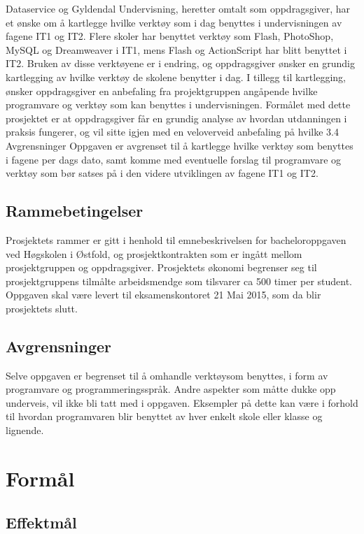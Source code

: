 \documentclass[norsk,a4paper,12pt]{article}
\begin{document}
Dataservice og Gyldendal Undervisning, heretter omtalt som oppdragsgiver,  har et ønske om å kartlegge hvilke verktøy som i dag benyttes i undervisningen av fagene IT1 og IT2. 
Flere skoler har benyttet verktøy som Flash, PhotoShop, MySQL og Dreamweaver i IT1, mens Flash og ActionScript har blitt benyttet i IT2. 
Bruken av disse verktøyene er i endring, og oppdragsgiver ønsker en grundig kartlegging av hvilke verktøy de skolene benytter i dag. I tillegg til kartlegging,  ønsker oppdragsgiver en anbefaling fra projektgruppen angåpende hvilke programvare og verktøy som kan benyttes i undervisningen. 
Formålet med dette prosjektet er at oppdragsgiver får en grundig analyse av hvordan utdanningen i praksis fungerer, og vil sitte igjen med en veloverveid anbefaling på hvilke 3.4 Avgrensninger
Oppgaven er avgrenset til å kartlegge hvilke verktøy som benyttes i fagene per dags dato, samt komme med eventuelle forslag til programvare og verktøy som bør satses på i den videre utviklingen av fagene IT1 og IT2. 

\subsection{Rammebetingelser}

Prosjektets rammer er gitt i henhold til emnebeskrivelsen for bacheloroppgaven ved Høgskolen i Østfold, og prosjektkontrakten som er ingått mellom prosjektgruppen og oppdragsgiver. Prosjektets økonomi begrenser seg til prosjektgruppens tilmålte arbeidsmendge som tilsvarer ca 500 timer per student. Oppgaven skal være levert til eksamenskontoret 21 Mai 2015, som da blir prosjektets slutt. 

\subsection{Avgrensninger}

Selve oppgaven er begrenset til å omhandle verktøysom benyttes, i form av programvare og programmeringsspråk. Andre aspekter som måtte dukke opp underveis, vil ikke bli tatt med i oppgaven. Eksempler på dette kan være i forhold til hvordan programvaren blir benyttet av hver enkelt skole eller klasse og lignende. 

\section{Formål}

\subsection{Effektmål}
\end{document}
